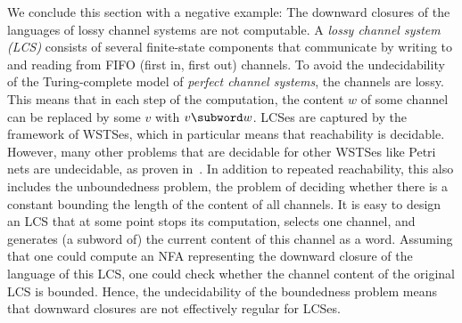 \documentclass[../../diss.tex]{subfiles}
\begin{document}
We conclude this section with a negative example: The downward closures of the languages of lossy channel systems are not computable.
A \emph{lossy channel system (LCS)} consists of several finite-state components that communicate by writing to and reading from FIFO (first in, first out) channels.
To avoid the undecidability of the Turing-complete model of \emph{perfect channel systems}, the channels are lossy.
This means that in each step of the computation, the content $w$ of some channel can be replaced by some $v$ with $v \subword w$.
LCSes are captured by the framework of WSTSes, which in particular means that reachability is decidable.
However, many other problems that are decidable for other WSTSes like Petri nets are undecidable, as proven in~\cite{Mayr03}.
In addition to repeated reachability, this also includes the unboundedness problem, \ie the problem of deciding whether there is a constant bounding the length of the content of all channels.
It is easy to design an LCS that at some point stops its computation, selects one channel, and generates (a subword of) the current content of this channel as a word.
Assuming that one could compute an NFA representing the downward closure of the language of this LCS, one could check whether the channel content of the original LCS is bounded.
Hence, the undecidability of the boundedness problem means that downward closures are not effectively regular for LCSes.
\end{document}
